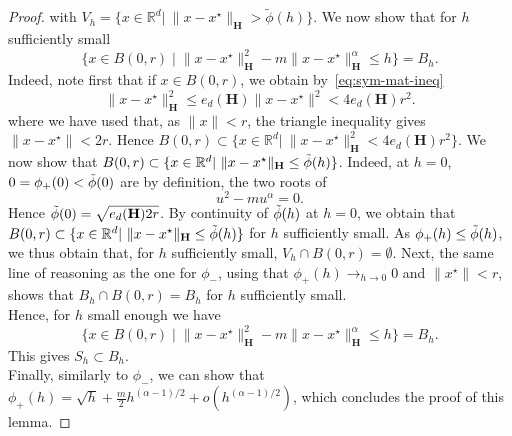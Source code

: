 \begin{proof}
with $V_{h}=\{x\in\mathbb{R}^{d}|\ \lVert x-x^{\star}\rVert_{\mathbf{H}}>\tilde{\phi}(h)\}$.
We now show that for $h$ sufficiently small
\[
\{x\in B(0,r)\mid\lVert x-x^{\star}\rVert_{\mathbf{H}}^{2}-m\lVert x-x^{\star}\rVert_{\mathbf{H}}^{\alpha}\leq h\}=B_{h}.
\]
Indeed, note first that if $x\in B(0,r)$, we obtain by~\eqref{eq:sym-mat-ineq}
\[
\lVert x-x^{\star}\rVert_{\mathbf{H}}^{2}\le e_{d}(\mathbf{H})\lVert x-x^{\star}\rVert^{2}<4e_{d}(\mathbf{H})r^{2}.
\]
where we have used that, as $\lVert x\rVert<r$, the triangle inequality
gives $\lVert x-x^{\star}\rVert<2r$. Hence $B(0,r)\subset\{x\in\mathbb{R}^{d}|\ \lVert x-x^{\star}\rVert_{\mathbf{H}}^{2}<4e_{d}(\mathbf{H})r^{2}\}$.
We now show that $B(0,r)\subset\{x\in\mathbb{R}^{d}|\ \lVert x-x^{\star}\rVert_{\mathbf{H}}\le\Tilde{\phi}(h)\}$.
Indeed, at $h=0$, $0=\phi_{+}(0)<\Tilde{\phi}(0)$ are by definition,
the two roots of 
\[
u^{2}-mu^{\alpha}=0.
\]
Hence $\Tilde{\phi}(0)=\sqrt{e_{d}(\mathbf{H})2r}$. By continuity
of $\Tilde{\phi}(h)$ at $h=0$, we obtain that $B(0,r)\subset\{x\in\mathbb{R}^{d}|\ \lVert x-x^{\star}\rVert_{\mathbf{H}}\le\Tilde{\phi}(h)\}$
for $h$ sufficiently small. As $\phi_{+}(h)\le\Tilde{\phi}(h)$,
we thus obtain that, for $h$ sufficiently small, $V_{h}\cap B(0,r)=\emptyset$.
Next, the same line of reasoning as the one for $\phi_{-}$, using
that $\phi_{+}(h)\rightarrow_{h\rightarrow0}0$ and $\lVert x^{\star}\rVert<r$,
shows that $B_{h}\cap B(0,r)=B_{h}$ for $h$ sufficiently small.
\\
Hence, for $h$ small enough we have
\[
\{x\in B(0,r)\mid\lVert x-x^{\star}\rVert_{\mathbf{H}}^{2}-m\lVert x-x^{\star}\rVert_{\mathbf{H}}^{\alpha}\leq h\}=B_{h}.
\]
This gives $S_h \subset B_h$.\\
Finally, similarly to $\phi_{-}$, we can show that $\phi_{+}(h)=\sqrt{h}+\frac{m}{2}h^{(\alpha-1)/2}+o(h^{(\alpha-1)/2})$,
which concludes the proof of this lemma. 
\end{proof}
